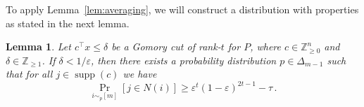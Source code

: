 \documentclass[11pt]{article}
\newcommand{\Z}{\mathbb{Z}}
\newcommand{\one}{\mathbf{1}}
\newcommand{\floor}[1]{\left\lfloor #1 \right\rfloor}
\DeclareMathOperator{\supp}{supp}
\newcommand{\proba}{\Pr}
\newcommand{\eps}{\varepsilon}
\newcommand{\numrounds}{t}
\newcommand{\rhs}{\delta}
\newtheorem{lemma}[theorem]{Lemma}
\theoremstyle{remark}
\begin{document}
To apply Lemma~\ref{lem:averaging}, we will construct a distribution with properties as stated
in the next lemma. 

\begin{lemma}\label{lem:distribution}
	Let $c^\intercal x \le \rhs$ be a Gomory cut of rank-$\numrounds$ for $P$, where $c \in \Z^n_{\ge 0}$ and $\rhs \in \Z_{\ge 1}$. If $\rhs < 1/\eps$, then there exists a probability distribution $p \in \Delta_{m-1}$ such that for all $j \in \supp(c)$ we have
	\begin{equation*}
		\proba_{i \sim_p [m]} [j \in N(i)] \ge \eps^{\numrounds} (1-\eps)^{2\numrounds-1} - \tau \,.
	\end{equation*}
\end{lemma}



%
%
\end{document}
